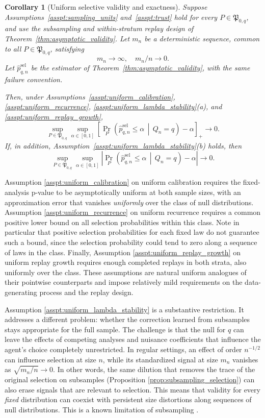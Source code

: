 \documentclass[10pt]{article}
\newtheorem{corollary}{Corollary}
\begin{document}
\begin{corollary}[Uniform selective validity and exactness]
\label{cor:uniform_validity}
Suppose Assumptions~\ref{asspt:sampling_units} and~\ref{asspt:trust} hold for every $P\in\mathfrak P_{0,q}$, and use the subsampling and within-stratum replay design of Theorem~\ref{thm:asymptotic_validity}. Let $m_n$ be a deterministic sequence, common to all $P\in\mathfrak P_{0,q}$, satisfying
\[
m_n\to\infty,\quad m_n/n\to0.
\]
Let $\widehat p^{\mathrm{sel}}_{q,n}$ be the estimator of Theorem~\ref{thm:asymptotic_validity}, with the same failure convention.

Then, under Assumptions~\ref{asspt:uniform_calibration}, \ref{asspt:uniform_recurrence}, \ref{asspt:uniform_lambda_stability}(a), and \ref{asspt:uniform_replay_growth},
\[
\sup_{P\in\mathfrak P_{0,q}}
\sup_{\alpha\in[0,1]}
\left[
\Pr_P\!\left(
\widehat p^{\mathrm{sel}}_{q,n}\le\alpha
\,\middle|\,Q_n=q
\right)-\alpha
\right]_+
\to0.
\]
If, in addition, Assumption~\ref{asspt:uniform_lambda_stability}(b) holds, then
\[
\sup_{P\in\mathfrak P_{0,q}}
\sup_{\alpha\in[0,1]}
\left|
\Pr_P\!\left(
\widehat p^{\mathrm{sel}}_{q,n}\le\alpha
\,\middle|\,Q_n=q
\right)-\alpha
\right|
\to0.
\]
\end{corollary}

Assumption \ref{asspt:uniform_calibration} on uniform calibration requires the fixed-analysis p-value to be asymptotically uniform at both sample sizes, with an approximation error that vanishes \emph{uniformly} over the class of null distributions. Assumption \ref{asspt:uniform_recurrence} on uniform recurrence requires a common positive lower bound on all selection probabilities within this class. Note in particular that positive selection probabilities for each fixed law do not guarantee such a bound, since the selection probability could tend to zero along a sequence of laws in the class. Finally, Assumption \ref{asspt:uniform_replay_growth} on uniform replay growth requires enough completed replays in both strata, also uniformly over the class. These assumptions are natural uniform analogues of their pointwise counterparts and impose relatively mild requirements on the data-generating process and the replay design.

Assumption \ref{asspt:uniform_lambda_stability} is a substantive restriction. It addresses a different problem: whether the correction learned from subsamples stays appropriate for the full sample. The challenge is that the null for $q$ can leave the effects of competing analyses and nuisance coefficients that influence the agent's choice completely unrestricted. In regular settings, an effect of order $n^{-1/2}$ can influence selection at size $n$, while its standardized signal at size $m_n$ vanishes as $\sqrt{m_n/n}\to0$. In other words, the same dilution that removes the trace of the original selection on subsamples (Proposition \ref{prop:subsampling_selection}) can also erase signals that are relevant to selection. This means that validity for every \emph{fixed} distribution can coexist with persistent size distortions along sequences of null distributions. This is a known limitation of subsampling \citep[Theorem~2.1]{andrews2010asymptotic,romano2012uniform}.
\end{document}

